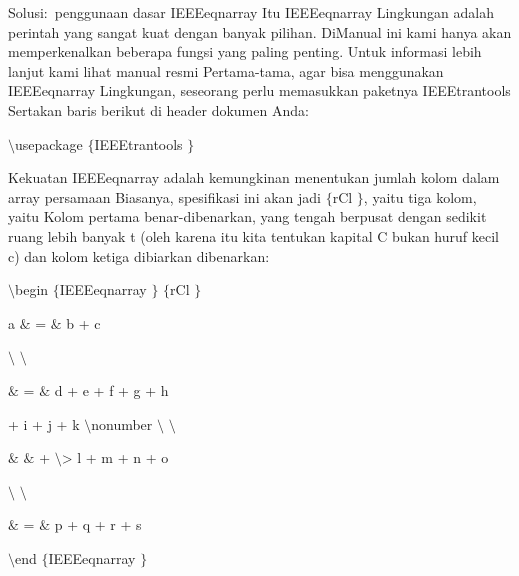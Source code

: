 \begin{itemize}
\vspace{12pt}
\noindent 
Solusi:~penggunaan dasar IEEEeqnarray Itu IEEEeqnarray  Lingkungan adalah perintah yang sangat kuat dengan banyak pilihan. DiManual ini kami hanya akan memperkenalkan beberapa fungsi yang paling penting. Untuk informasi lebih lanjut kami lihat manual resmi Pertama-tama, agar bisa menggunakan IEEEeqnarray Lingkungan, seseorang perlu memasukkan paketnya IEEEtrantools Sertakan baris berikut di header dokumen Anda: \par
\vspace{12pt}
\vspace{12pt}
\noindent 
 $  \setminus  $usepackage $  \{  $IEEEtrantools $  \}  $ \par
\vspace{12pt}
\noindent 
Kekuatan IEEEeqnarray adalah kemungkinan menentukan jumlah kolom dalam array persamaan Biasanya, spesifikasi ini akan jadi  $  \{  $rCl $  \}  $, yaitu tiga kolom, yaitu Kolom pertama benar-dibenarkan, yang tengah berpusat dengan sedikit ruang lebih banyak t (oleh karena itu kita tentukan kapital C bukan huruf kecil c) dan kolom ketiga dibiarkan dibenarkan: \par
\vspace{12pt}
\noindent 
 $  \setminus  $begin $  \{  $IEEEeqnarray $  \}  $ $  \{  $rCl $  \}  $ \par
\vspace{12pt}
\noindent 
a  $  \&  $ =  $  \&  $ b + c \par
\vspace{12pt}
\noindent 
 $  \setminus  $ $  \setminus  $ \par
\vspace{12pt}
\noindent 
 $  \&  $ =  $  \&  $ d + e + f + g + h \par
\vspace{12pt}
\noindent 
+ i + j + k  $  \setminus  $nonumber $  \setminus  $ $  \setminus  $ \par
\vspace{12pt}
\noindent 
 $  \&  $ $  \&  $ + $  \setminus  $> l + m + n + o \par
\vspace{12pt}
\noindent 
 $  \setminus  $ $  \setminus  $ \par
\vspace{12pt}
\noindent 
 $  \&  $ =  $  \&  $ p + q + r + s \par
\vspace{12pt}
\noindent 
 $  \setminus  $end $  \{  $IEEEeqnarray $  \}  $ \par

\end{itemize}
